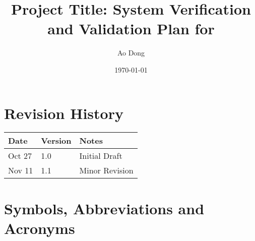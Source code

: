 \documentclass[12pt, titlepage]{article}
\begin{document}
\title{Project Title: System Verification and Validation Plan for \progname{}} 
\author{Ao Dong}
\date{\today}
	
\maketitle


\section{Revision History}

\begin{tabularx}{\textwidth}{p{3cm}p{2cm}X}
\toprule {\bf Date} & {\bf Version} & {\bf Notes}\\
\midrule
Oct 27 & 1.0 & Initial Draft\\
Nov 11 & 1.1 & Minor Revision\\
\bottomrule
\end{tabularx}

\newpage

\tableofcontents

\listoftables

\listoffigures

\newpage

\section{Symbols, Abbreviations and Acronyms}
\end{document}
